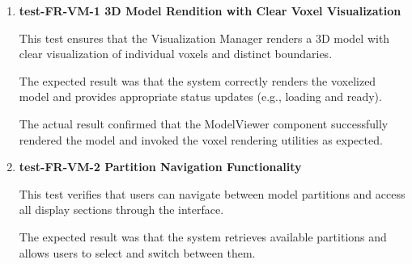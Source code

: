 \documentclass[12pt, titlepage]{article}
\begin{document}
\begin{enumerate}

\item \textbf{test-FR-VM-1 3D Model Rendition with Clear Voxel Visualization}

\hspace{1.5em} This test ensures that the Visualization Manager renders a 3D model with clear visualization of individual voxels and distinct boundaries.

The expected result was that the system correctly renders the voxelized model and provides appropriate status updates (e.g., loading and ready).

The actual result confirmed that the ModelViewer component successfully rendered the model and invoked the voxel rendering utilities as expected.



\item \textbf{test-FR-VM-2 Partition Navigation Functionality}

\hspace{1.5em} This test verifies that users can navigate between model partitions and access all display sections through the interface.

The expected result was that the system retrieves available partitions and allows users to select and switch between them.


\end{enumerate}
\end{document}
